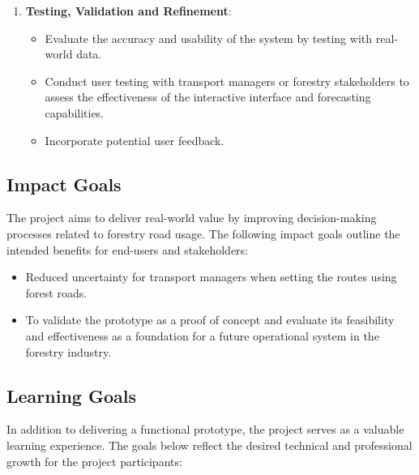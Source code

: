 \begin{enumerate}
    \item \textbf{Testing, Validation and Refinement}:
    \begin{itemize}
        \item Evaluate the accuracy and usability of the system by testing with real-world data. 
        \item Conduct user testing with transport managers or forestry stakeholders to assess the effectiveness of the interactive interface and forecasting capabilities. 
        \item Incorporate potential user feedback. 
    \end{itemize} 
\end{enumerate}


\subsection{Impact Goals}\label{subsec:req:impactgoals}

The project aims to deliver real-world value by improving decision-making processes related to forestry road usage. The following impact goals outline the intended benefits for end-users and stakeholders:

\begin{itemize}
    \item Reduced uncertainty for transport managers when setting the routes using forest roads.
    \item To validate the prototype as a proof of concept and evaluate its feasibility and effectiveness as a foundation for a future operational system in the forestry industry.
\end{itemize}

\subsection{Learning Goals}\label{subsec:req:learninggoals}

In addition to delivering a functional prototype, the project serves as a valuable learning experience. The goals below reflect the desired technical and professional growth for the project participants:

